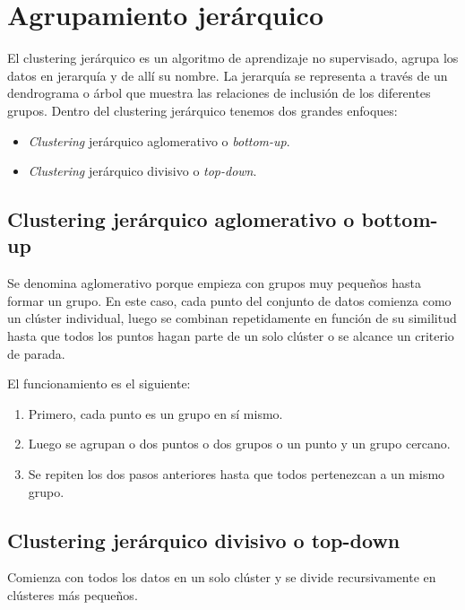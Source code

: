 \chapter{Agrupamiento jerárquico}


El clustering jerárquico es un algoritmo de aprendizaje no supervisado, agrupa los  datos en jerarquía y de allí su nombre. La jerarquía se representa a través de un dendrograma o árbol que muestra las relaciones de inclusión de los diferentes
grupos. Dentro del clustering jerárquico tenemos dos grandes enfoques:

\begin{itemize}
    \item \textit{Clustering} jerárquico aglomerativo o \textit{bottom-up}.

    \item \textit{Clustering} jerárquico divisivo o \textit{top-down}.
\end{itemize}

\section{Clustering jerárquico aglomerativo o bottom-up}

Se denomina aglomerativo porque empieza con grupos muy pequeños hasta formar  un grupo. En este caso, cada punto del conjunto de datos comienza como un clúster individual, luego se combinan repetidamente en función de su similitud hasta que todos los puntos hagan parte de un solo clúster o se alcance un criterio de parada.

El funcionamiento es el siguiente:

\begin{enumerate}
    \item Primero, cada punto es un grupo en sí mismo.
    \item Luego se agrupan o dos puntos o dos grupos o un punto y un grupo cercano.
    \item Se repiten los dos pasos anteriores hasta que todos pertenezcan a un mismo grupo.
    
\end{enumerate}

\section{Clustering jerárquico divisivo o top-down}
Comienza con todos los datos en un solo clúster y se divide recursivamente en clústeres más pequeños.


